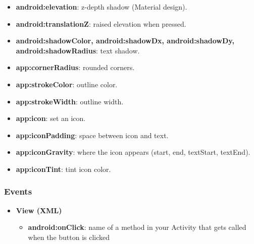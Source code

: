 \documentclass{report}
\begin{document}
\begin{itemize}
\begin{itemize}
                \item \textbf{android:elevation}: z-depth shadow (Material design).
                \item \textbf{android:translationZ}: raised elevation when pressed.
                \item \textbf{android:shadowColor, android:shadowDx, android:shadowDy, android:shadowRadius}: text shadow.
                \item \textbf{app:cornerRadius}: rounded corners.
                \item \textbf{app:strokeColor}: outline color.
                \item \textbf{app:strokeWidth}: outline width.
                \item \textbf{app:icon}: set an icon.
                \item \textbf{app:iconPadding}: space between icon and text.
                \item \textbf{app:iconGravity}: where the icon appears (start, end, textStart, textEnd).
                \item \textbf{app:iconTint}: tint icon color.
            \end{itemize}
    \end{itemize}

    \pagebreak 
    \subsubsection{Events}
    \begin{itemize}
        \item \textbf{View (XML)}
            \begin{itemize}
                \item \textbf{android:onClick}: name of a method in your Activity that gets called when the button is clicked
            \end{itemize}
    \end{itemize}

    \pagebreak 
\end{document}
